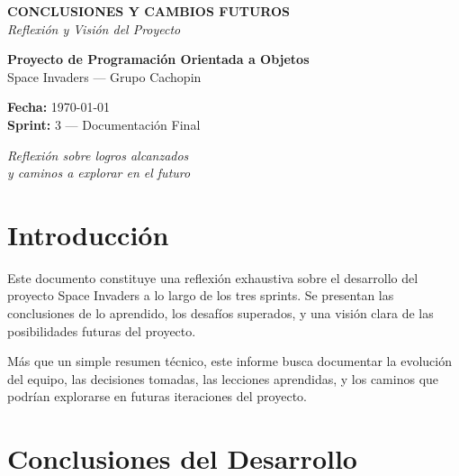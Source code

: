 \documentclass[12pt, a4paper]{article}
\begin{document}
\begin{titlepage}
    \centering
    \vspace*{2cm}
    
    {\LARGE \textbf{CONCLUSIONES Y CAMBIOS FUTUROS}}\\[0.5em]
    {\Large \textit{Reflexión y Visión del Proyecto}}\\[1.5em]
    
    \vspace{1cm}
    
    {\large \textbf{Proyecto de Programación Orientada a Objetos}}\\[0.3em]
    {\large Space Invaders — Grupo Cachopin}\\[1em]
    
    \vspace{2cm}
    
    {\textbf{Fecha:}} \today\\[0.5em]
    {\textbf{Sprint:}} 3 — Documentación Final\\[3em]
    
    \vspace{2cm}
    
    {\large \textit{Reflexión sobre logros alcanzados}}\\[0.2em]
    {\large \textit{y caminos a explorar en el futuro}}
    
    \vfill
    
\end{titlepage}

\newpage
\tableofcontents
\newpage

\section{Introducción}

Este documento constituye una reflexión exhaustiva sobre el desarrollo del proyecto Space Invaders a lo largo de los tres sprints. Se presentan las conclusiones de lo aprendido, los desafíos superados, y una visión clara de las posibilidades futuras del proyecto.

Más que un simple resumen técnico, este informe busca documentar la evolución del equipo, las decisiones tomadas, las lecciones aprendidas, y los caminos que podrían explorarse en futuras iteraciones del proyecto.

\section{Conclusiones del Desarrollo}
\end{document}
